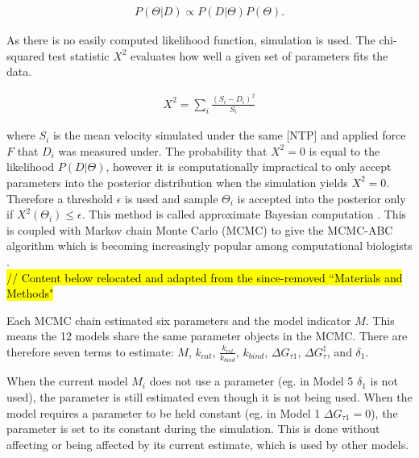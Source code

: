 \documentclass[10pt,letterpaper]{article}
\begin{document}
\begin{eqnarray}
    P(\Theta | D) \propto P(D | \Theta) P(\Theta).
\end{eqnarray}

As there is no easily computed likelihood function, simulation is used. The chi-squared test statistic $X^2$  evaluates how well a given set of parameters fits the data.

\begin{eqnarray}
    X^2 = \sum\limits_{i} \frac{(S_i - D_i)^2}{S_i}
\end{eqnarray}

where $S_i$ is the mean velocity simulated under the same [NTP] and applied force $F$ that $D_i$ was measured under. The probability that $X^2=0$ is equal to the likelihood $P(D | \Theta)$, however it is computationally impractical to only accept parameters into the posterior distribution when the simulation yields $X^2=0$. Therefore a threshold $\epsilon$ is used and sample $\Theta_i$ is accepted into the posterior only if $X^2(\Theta_i) \leq \epsilon$. This method is called approximate Bayesian computation \cite{beaumont2010approximate, csillery2010approximate}. This is coupled with Markov chain Monte Carlo (MCMC) to give the MCMC-ABC algorithm which is becoming increasingly popular among computational biologists \cite{beaumont2010approximate, ratmann2007using}.  \\


\textcolor{red}{\hl{// Content below relocated and adapted from the since-removed ``Materials and Methods"}}




Each MCMC chain estimated six parameters and the model indicator $M$. This means the 12 models share the same parameter objects in the MCMC. There are therefore seven terms to estimate: $M$, $k_{cat}$, $\frac{k_{rel}}{k_{bind}}$, $k_{bind}$, $\Delta G_{\tau 1}$, $\Delta G^\ddag_\tau$, and $\delta_1$.


When the current model $M_i$ does not use a parameter (eg. in Model 5 $\delta_1$ is not used), the parameter is still estimated even though it is not being used. When the model requires a parameter to be held constant (eg. in Model 1 $\Delta G_{\tau 1} = 0$), the parameter is set to its constant during the simulation. This is done without affecting or being affected by its current estimate, which is used by other models.


\end{document}

